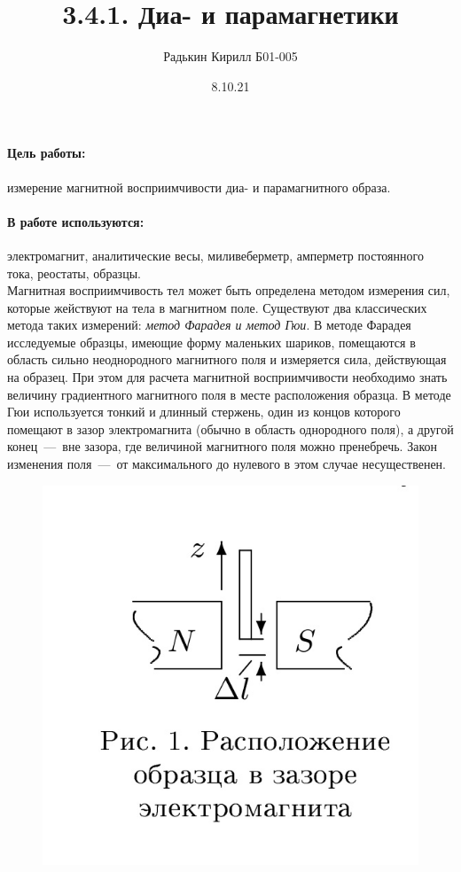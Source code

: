 \documentclass[a4paper, 12pt]{article}
\author{Радькин Кирилл Б01-005}
\title{3.4.1. Диа- и парамагнетики}
\date{8.10.21}
\newcommand{\parag}[1]{\paragraph*{#1:}}
\begin{document}
\maketitle

\parag {Цель работы} измерение магнитной восприимчивости диа- и парамагнитного образа.

\parag {В работе используются} электромагнит, аналитические весы, миливеберметр, амперметр постоянного тока, реостаты, образцы.
\\

Магнитная восприимчивость тел может быть определена методом измерения сил, которые жействуют на тела в магнитном поле. 
Существуют два классических метода таких измерений: \textit{метод Фарадея и метод Гюи}. 
В методе Фарадея исследуемые образцы, имеющие форму маленьких шариков, помещаются в область сильно неоднородного магнитного поля и измеряется сила, действующая на образец. 
При этом для расчета магнитной восприимчивости необходимо знать величину градиентного магнитного поля в месте расположения образца. 
В методе Гюи используется тонкий и длинный стержень, один из концов которого помещают в зазор электромагнита (обычно в область однородного поля), а другой конец~---~вне зазора, где величиной магнитного поля можно пренебречь. 
Закон изменения поля~---~от максимального до нулевого в этом случае несущественен.
\\

\begin{figure}
    \includegraphics[scale=0.2]{pic1.jpg}
\end{figure}
\end{document}
